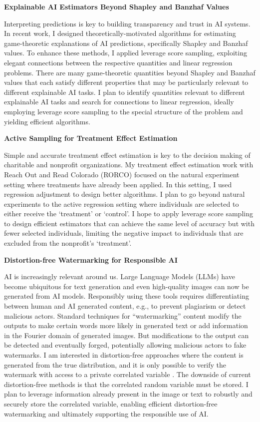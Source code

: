 \documentclass[11pt]{article}
\begin{document}
{{\large \textbf{Explainable AI Estimators Beyond Shapley and Banzhaf Values}}

Interpreting predictions is key to building transparency and trust in AI systems. In recent work, I designed theoretically-motivated algorithms for estimating game-theoretic explanations of AI predictions, specifically Shapley and Banzhaf values. To enhance these methods, I applied leverage score sampling, exploiting elegant connections between the respective quantities and linear regression problems. There are many game-theoretic quantities beyond Shapley and Banzhaf values that each satisfy different properties that may be particularly relevant to different explainable AI tasks. I plan to identify quantities relevant to different explainable AI tasks and search for connections to linear regression, ideally employing leverage score sampling to the special structure of the problem and yielding efficient algorithms.

{\large \textbf{Active Sampling for Treatment Effect Estimation}}

Simple and accurate treatment effect estimation is key to the decision making of charitable and nonprofit organizations. My treatment effect estimation work with Reach Out and Read Colorado (RORCO) focused on the natural experiment setting where treatments have already been applied. In this setting, I used regression adjustment to design better algorithms. I plan to go beyond natural experiments to the active regression setting where individuals are selected to either receive the ‘treatment’ or ‘control’. I hope to apply leverage score sampling to design efficient estimators that can achieve the same level of accuracy but with fewer selected individuals, limiting the negative impact to individuals that are excluded from the nonprofit’s `treatment’.

{\large \textbf{Distortion-free Watermarking for Responsible AI}}

AI is increasingly relevant around us. Large Language Models (LLMs) have become ubiquitous for text generation and even high-quality images can now be generated from AI models. Responsibly using these tools requires differentiating between human and AI generated content, e.g., to prevent plagiarism or detect malicious actors. Standard techniques for “watermarking” content modify the outputs to make certain words more likely in generated text or add information in the Fourier domain of generated images. But modifications to the output can be detected and eventually forged, potentially allowing malicious actors to fake watermarks. I am interested in distortion-free approaches where the content is generated from the true distribution, and it is only possible to verify the watermark with access to a private correlated variable \cite{arabi2024hidden}. The downside of current distortion-free methods is that the correlated random variable must be stored. I plan to leverage information already present in the image or text to robustly and securely store the correlated variable, enabling efficient distortion-free watermarking and ultimately supporting the responsible use of AI.

}
\end{document}
